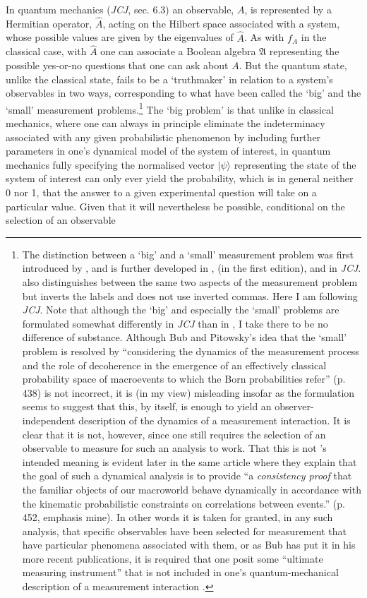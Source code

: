 \documentclass[12pt,english,twoside]{article}
\numberwithin{equation}{section}
\begin{document}
In quantum mechanics (\emph{JCJ}, sec. 6.3) an observable, $A$, is represented by a Hermitian operator, $\hat{A}$, acting on the Hilbert space associated with a system, whose possible values are given by the eigenvalues of $\hat{A}$. As with $f_A$ in the classical case, with $\hat{A}$ one can associate a Boolean algebra $\mathfrak{A}$ representing the possible yes-or-no questions that one can ask about $A$. But the quantum state, unlike the classical state, fails to be a `truthmaker' in relation to a system's observables in two ways, corresponding to what have been called the `big' and the `small' measurement problems.\footnote{\label{fn:big-small}The distinction between a `big' and a `small' measurement problem was first introduced by \citet[]{pitowsky2006}, and is further developed in \citet[]{bub-pitowsky2010}, \citet[]{bub2016} (in the first edition), and in \emph{JCJ}. \citet[]{brukner2017} also distinguishes between the same two aspects of the measurement problem but inverts the labels and does not use inverted commas. Here I am following \emph{JCJ}. Note that although the `big' and especially the `small' problems are formulated somewhat differently in \emph{JCJ} than in \citet[]{bub-pitowsky2010}, I take there to be no difference of substance. Although Bub and Pitowsky's idea that the `small' problem is resolved by ``considering the dynamics of the measurement process and the role of decoherence in the emergence of an effectively classical probability space of macroevents to which the Born probabilities refer'' (p. 438) is not incorrect, it is (in my view) misleading insofar as the formulation seems to suggest that this, by itself, is enough to yield an observer-independent description of the dynamics of a measurement interaction. It is clear that it is not, however, since one still requires the selection of an observable to measure for such an analysis to work. That this is not \citeauthor{bub-pitowsky2010}'s intended meaning is evident later in the same article where they explain that the goal of such a dynamical analysis is to provide ``a \emph{consistency proof} that the familiar objects of our macroworld behave dynamically in accordance with the kinematic probabilistic constraints on correlations between events.'' (p. 452, emphasis mine). In other words it is taken for granted, in any such analysis, that specific observables have been selected for measurement that have particular phenomena associated with them, or as Bub has put it in his more recent publications, it is required that one posit some ``ultimate measuring instrument'' that is not included in one's quantum-mechanical description of a measurement interaction \citep[pp. 8--9]{bub2018a}.} The `big problem' is that unlike in classical mechanics, where one can always in principle eliminate the indeterminacy associated with any given probabilistic phenomenon by including further parameters in one's dynamical model of the system of interest, in quantum mechanics fully specifying the normalised vector $| \psi \rangle$ representing the state of the system of interest can only ever yield the probability, which is in general neither 0 nor 1, that the answer to a given experimental question will take on a particular value. Given that it will nevertheless be possible, conditional on the selection of an observable 
\end{document}
